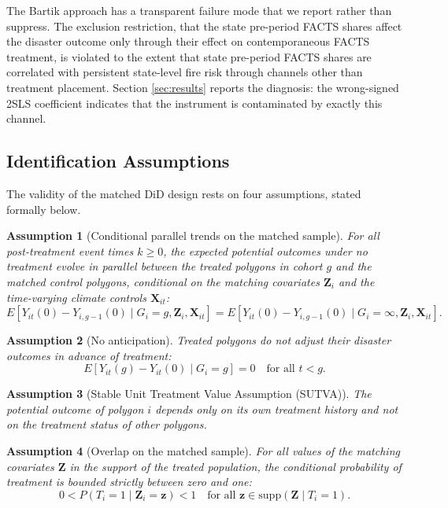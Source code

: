 \documentclass[12pt, letterpaper]{article}
\newtheorem{assumption}{Assumption}
\begin{document}
The Bartik approach has a transparent failure mode that we report rather than suppress. The exclusion restriction, that the state pre-period FACTS shares affect the disaster outcome only through their effect on contemporaneous FACTS treatment, is violated to the extent that state pre-period FACTS shares are correlated with persistent state-level fire risk through channels other than treatment placement. Section \ref{sec:results} reports the diagnosis: the wrong-signed 2SLS coefficient indicates that the instrument is contaminated by exactly this channel.

\subsection{Identification Assumptions}

The validity of the matched DiD design rests on four assumptions, stated formally below.

\begin{assumption}[Conditional parallel trends on the matched sample]
\label{ass:parallel}
For all post-treatment event times $k \geq 0$, the expected potential outcomes under no treatment evolve in parallel between the treated polygons in cohort $g$ and the matched control polygons, conditional on the matching covariates $\mathbf{Z}_i$ and the time-varying climate controls $\mathbf{X}_{it}$:
$$E[Y_{it}(0) - Y_{i,g-1}(0) \mid G_i = g, \mathbf{Z}_i, \mathbf{X}_{it}] = E[Y_{it}(0) - Y_{i,g-1}(0) \mid G_i = \infty, \mathbf{Z}_i, \mathbf{X}_{it}].$$
\end{assumption}

\begin{assumption}[No anticipation]
\label{ass:anticipation}
Treated polygons do not adjust their disaster outcomes in advance of treatment:
$$E[Y_{it}(g) - Y_{it}(0) \mid G_i = g] = 0 \quad \text{for all } t < g.$$
\end{assumption}

\begin{assumption}[Stable Unit Treatment Value Assumption (SUTVA)]
\label{ass:sutva}
The potential outcome of polygon $i$ depends only on its own treatment history and not on the treatment status of other polygons.
\end{assumption}

\begin{assumption}[Overlap on the matched sample]
\label{ass:overlap}
For all values of the matching covariates $\mathbf{Z}$ in the support of the treated population, the conditional probability of treatment is bounded strictly between zero and one:
$$0 < P(T_i = 1 \mid \mathbf{Z}_i = \mathbf{z}) < 1 \quad \text{for all } \mathbf{z} \in \text{supp}(\mathbf{Z} \mid T_i = 1).$$
\end{assumption}
\end{document}
